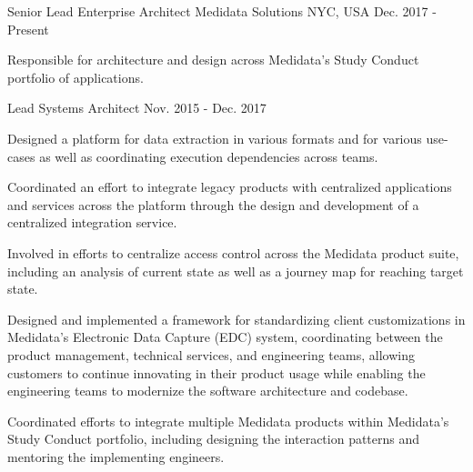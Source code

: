 

\begin{cventries}

  \cventry
    {Senior Lead Enterprise Architect} %
    {Medidata Solutions} %
    {NYC, USA} %
    {Dec. 2017 - Present} %
    {
      \begin{cvitems} %
        \item {Responsible for architecture and design across
        Medidata's Study Conduct portfolio of applications.}
      \end{cvitems}
    }
    
  \cventry
    {Lead Systems Architect}
    {}
    {}
    {Nov. 2015 - Dec. 2017}
    {
        \begin{cvitems}
          \item {Designed a platform for data extraction in various formats and for various use-cases as well as coordinating execution dependencies across teams.}
          \item {Coordinated an effort to integrate legacy products with centralized applications and services across the platform through the design and development of a centralized integration service.}
          \item {Involved in efforts to centralize access control across the Medidata product suite, including an analysis of current state as well as a journey map for reaching target state.}
          \item {Designed and implemented a framework for standardizing client customizations in Medidata's Electronic Data Capture (EDC) system, coordinating between the product management, technical services, and engineering teams, allowing customers to continue innovating in their product usage while enabling the engineering teams to modernize the software architecture and codebase.}
          \item {Coordinated efforts to integrate multiple Medidata products within Medidata's Study Conduct portfolio, including designing the interaction patterns and mentoring the implementing engineers.}
        \end{cvitems}
    }
    

\end{cventries}
